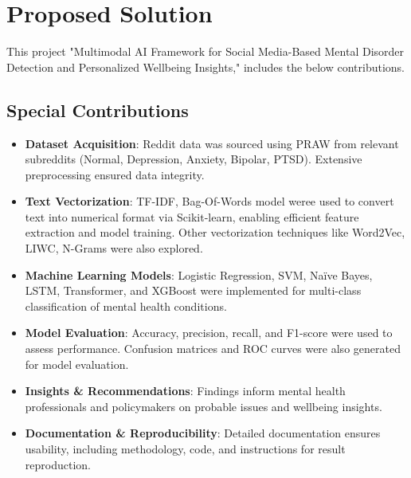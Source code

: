 
\section{Proposed Solution}
\noindent
This project "Multimodal AI Framework for Social Media-Based Mental Disorder Detection and Personalized Wellbeing Insights," includes the below contributions.

\subsection{Special Contributions}
\begin{itemize}
    \item \textbf{Dataset Acquisition}: Reddit data was sourced using PRAW from relevant subreddits (Normal, Depression, Anxiety, Bipolar, PTSD). Extensive preprocessing ensured data integrity.
    
    \item \textbf{Text Vectorization}: TF-IDF, Bag-Of-Words model weree used to convert text into numerical format via Scikit-learn, enabling efficient feature extraction and model training. Other vectorization techniques like Word2Vec, LIWC, N-Grams were also explored.
    
    \item \textbf{Machine Learning Models}: Logistic Regression, SVM, Naïve Bayes, LSTM, Transformer, and XGBoost were implemented for multi-class classification of mental health conditions.
    
    \item \textbf{Model Evaluation}: Accuracy, precision, recall, and F1-score were used to assess performance. Confusion matrices and ROC curves were also generated for model evaluation.
    
    \item \textbf{Insights \& Recommendations}: Findings inform mental health professionals and policymakers on probable issues and wellbeing insights.
    
    \item \textbf{Documentation \& Reproducibility}: Detailed documentation ensures usability, including methodology, code, and instructions for result reproduction.
\end{itemize}

